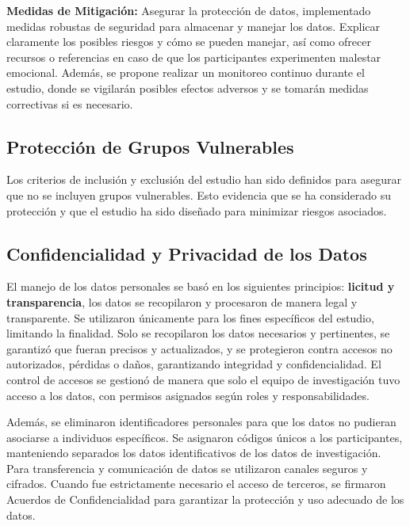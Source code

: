 \textbf{Medidas de Mitigación:} Asegurar la protección de datos, implementado medidas robustas de seguridad para almacenar y manejar los datos. Explicar claramente los posibles riesgos y cómo se pueden manejar, así como ofrecer recursos o referencias en caso de que los participantes experimenten malestar emocional. Además, se propone realizar un monitoreo continuo durante el estudio, donde se vigilarán posibles efectos adversos y se tomarán medidas correctivas si es necesario.

\subsection{Protección de Grupos Vulnerables}
\label{subsec:proteccion_grupos_vulnerables}

Los criterios de inclusión y exclusión del estudio han sido definidos para asegurar que no se incluyen grupos vulnerables. Esto evidencia que se ha considerado su protección y que el estudio ha sido diseñado para minimizar riesgos asociados.

\subsection{Confidencialidad y Privacidad de los Datos}
\label{subsec:confidencialidad_privacidad}

El manejo de los datos personales se basó en los siguientes principios: \textbf{licitud y transparencia}, los datos se recopilaron y procesaron de manera legal y transparente. Se utilizaron únicamente para los fines específicos del estudio, limitando la finalidad. Solo se recopilaron los datos necesarios y pertinentes, se garantizó que fueran precisos y actualizados, y se protegieron contra accesos no autorizados, pérdidas o daños, garantizando integridad y confidencialidad. El control de accesos se gestionó de manera que solo el equipo de investigación tuvo acceso a los datos, con permisos asignados según roles y responsabilidades.

Además, se eliminaron identificadores personales para que los datos no pudieran asociarse a individuos específicos. Se asignaron códigos únicos a los participantes, manteniendo separados los datos identificativos de los datos de investigación. Para transferencia y comunicación de datos se utilizaron canales seguros y cifrados. Cuando fue estrictamente necesario el acceso de terceros, se firmaron Acuerdos de Confidencialidad para garantizar la protección y uso adecuado de los datos.


